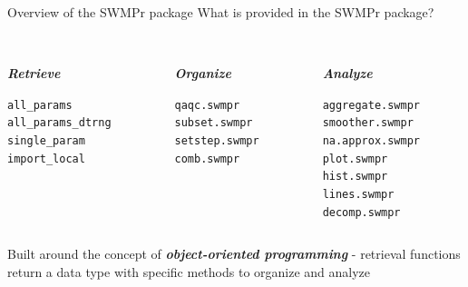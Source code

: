 \documentclass[xcolor=svgnames]{beamer}\usepackage[]{graphicx}\usepackage[]{color}
\makeatletter
\newcommand{\hlstd}[1]{\textcolor[rgb]{0.345,0.345,0.345}{#1}}%
\newenvironment{kframe}{%
 \def\at@end@of@kframe{}%
 \ifinner\ifhmode%
  \def\at@end@of@kframe{\end{minipage}}%
  \begin{minipage}{\columnwidth}%
 \fi\fi%
 \def\FrameCommand##1{\hskip\@totalleftmargin \hskip-\fboxsep
 \colorbox{shadecolor}{##1}\hskip-\fboxsep
     \hskip-\linewidth \hskip-\@totalleftmargin \hskip\columnwidth}%
 \MakeFramed {\advance\hsize-\width
   \@totalleftmargin\z@ \linewidth\hsize
   \@setminipage}}%
 {\par\unskip\endMakeFramed%
 \at@end@of@kframe}
\newenvironment{knitrout}{}{} %
\newcommand{\Bigtxt}[1]{\textbf{\textit{#1}}}
\makeatother
\begin{document}
\begin{frame}[fragile]{Overview of the SWMPr package}
What is provided in the SWMPr package? \\~\\
\begin{columns}[t]
\begin{column}{0.3\textwidth}
\Bigtxt{Retrieve}
\begin{knitrout}\scriptsize
{}\color{fgcolor}\begin{kframe}
\begin{alltt}
\hlstd{all_params}
\hlstd{all_params_dtrng}
\hlstd{single_param}
\hlstd{import_local}
\end{alltt}
\end{kframe}
\end{knitrout}
\end{column}
\begin{column}{0.3\textwidth}
\Bigtxt{Organize}
\begin{knitrout}\scriptsize
{}\color{fgcolor}\begin{kframe}
\begin{alltt}
\hlstd{qaqc.swmpr}
\hlstd{subset.swmpr}
\hlstd{setstep.swmpr}
\hlstd{comb.swmpr}
\end{alltt}
\end{kframe}
\end{knitrout}
\end{column}
\begin{column}{0.3\textwidth}
\Bigtxt{Analyze}
\begin{knitrout}\scriptsize
{}\color{fgcolor}\begin{kframe}
\begin{alltt}
\hlstd{aggregate.swmpr}
\hlstd{smoother.swmpr}
\hlstd{na.approx.swmpr}
\hlstd{plot.swmpr}
\hlstd{hist.swmpr}
\hlstd{lines.swmpr}
\hlstd{decomp.swmpr}
\end{alltt}
\end{kframe}
\end{knitrout}
\end{column}
\end{columns}
\vspace{0.15in}
Built around the concept of \Bigtxt{object-oriented programming} - retrieval functions return a data type with specific methods to organize and analyze
\end{frame}
\end{document}
